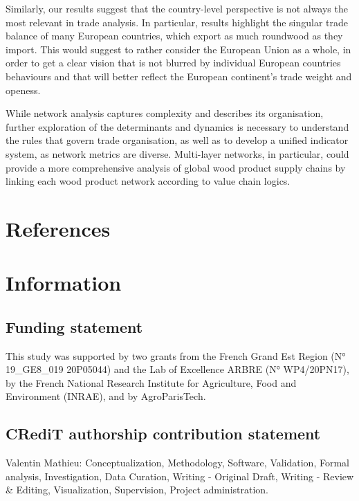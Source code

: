 \documentclass[
  authoryear,
  review,
  3p]{elsarticle}
\begin{document}
Similarly, our results suggest that the country-level perspective is not
always the most relevant in trade analysis. In particular, results
highlight the singular trade balance of many European countries, which
export as much roundwood as they import. This would suggest to rather
consider the European Union as a whole, in order to get a clear vision
that is not blurred by individual European countries behaviours and that
will better reflect the European continent's trade weight and openess.

While network analysis captures complexity and describes its
organisation, further exploration of the determinants and dynamics is
necessary to understand the rules that govern trade organisation, as
well as to develop a unified indicator system, as network metrics are
diverse. Multi-layer networks, in particular, could provide a more
comprehensive analysis of global wood product supply chains by linking
each wood product network according to value chain logics.

\section*{References}\label{references}

\renewcommand{\bibsection}{}


\newpage{}

\section{Information}\label{information}

\subsection{Funding statement}\label{funding-statement}

This study was supported by two grants from the French Grand Est Region
(N° 19\_GE8\_019 20P05044) and the Lab of Excellence ARBRE (N°
WP4/20PN17), by the French National Research Institute for Agriculture,
Food and Environment (INRAE), and by AgroParisTech.

\subsection{CRediT authorship contribution
statement}\label{credit-authorship-contribution-statement}

Valentin Mathieu: Conceptualization, Methodology, Software, Validation,
Formal analysis, Investigation, Data Curation, Writing - Original Draft,
Writing - Review \& Editing, Visualization, Supervision, Project
administration.
\end{document}
